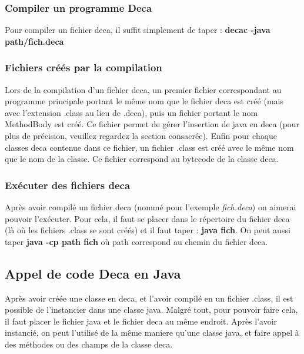 \documentclass[12pt, a4paper, one side]{article}
\begin{document}
    \subsubsection{Compiler un programme Deca}

    Pour compiler un fichier deca, il suffit simplement de taper : \newline
    \textbf{decac -java path/fich.deca}

    \subsubsection{Fichiers créés par la compilation}

    Lors de la compilation d'un fichier deca, un premier fichier correspondant
    au programme principale portant le même nom que le fichier deca est créé (mais
    avec l'extension .class au lieu de .deca), puis un fichier portant le nom
    MethodBody est créé. Ce fichier permet de gérer l'insertion de java en deca
    (pour plus de précision, veuillez regardez la section consacrée). Enfin pour
    chaque classes deca contenue dans ce fichier, un fichier .class est créé avec
    le même nom que le nom de la classe. Ce fichier correspond au bytecode de la
    classe deca.

    \subsubsection{Exécuter des fichiers deca}

    Après avoir compilé un fichier deca (nommé pour l'exemple \textit{fich.deca})
    on aimerai pouvoir l'exécuter. Pour cela, il faut se placer dans le répertoire
    du fichier deca (là où les fichiers .class se sont créés) et il faut taper :
    \newline \textbf{java fich}. On peut aussi taper \textbf{java -cp path fich} où path correspond au chemin du fichier deca.

    \subsection{Appel de code Deca en Java}

    Après avoir créée une classe en deca, et l'avoir compilé en un fichier .class,
    il est possible de l'instancier dans une classe java. Malgré tout, pour pouvoir
    faire cela, il faut placer le fichier java et le fichier deca au même endroit.
    Après l'avoir instancié, on peut l'utilisé de la même maniere qu'une classe
    java, et faire appel à des méthodes ou des champs de la classe deca.
\end{document}
